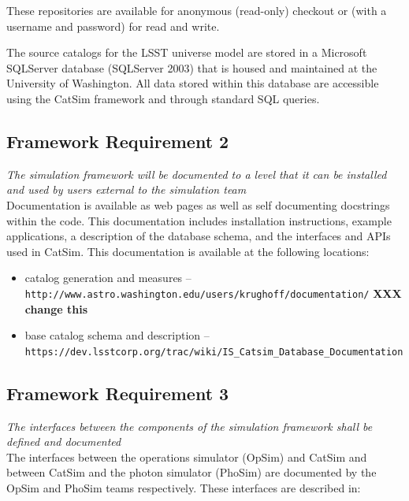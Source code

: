 \documentclass[11pt]{article}
\begin{document}
These repositories are available for anonymous (read-only) checkout or
(with a username and password) for read and write.

The source catalogs for the LSST universe model are stored in a
Microsoft SQLServer database (SQLServer 2003) that is housed and
maintained at the University of Washington. All data stored within
this database are accessible using the CatSim framework and through
standard SQL queries.

\subsection{Framework Requirement 2}

{\it The simulation framework will be documented to a level
  that it can be installed and used by users external to the
  simulation team}\\

Documentation is available as web pages as well as self documenting
docstrings within the code.  This documentation includes installation
instructions, example applications, a description of the database
schema, and the interfaces and APIs used in CatSim. This documentation
is available at the following locations:
\begin{itemize}
\item catalog generation and measures -- {\tt http://www.astro.washington.edu/users/krughoff/documentation/}
{\bf XXX change this}

\item base catalog schema and description -- {\tt https://dev.lsstcorp.org/trac/wiki/IS\_Catsim\_Database\_Documentation}
\end{itemize}


\subsection{Framework Requirement 3}

{\it  The interfaces between the components of the simulation framework shall be defined 
and documented}\\

The interfaces between the operations simulator (OpSim) and CatSim and
between CatSim and the photon simulator (PhoSim) are documented by the
OpSim and PhoSim teams respectively.  These interfaces are described in:
\end{document}
